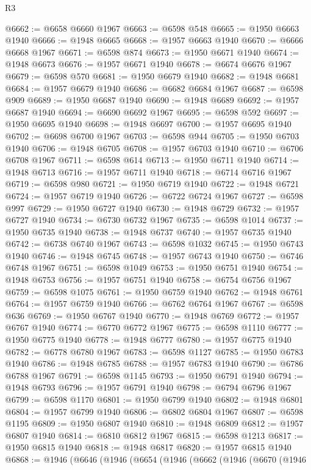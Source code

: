 \begin{lexlean}{R3}
\begin{coremodule}
@6662 := @6658 @6660 @1967
@6663 := @6598 @548
@6665 := @1950 @6663 @1940
@6666 := @1948 @6665
@6668 := @1957 @6663 @1940
@6670 := @6666 @6668 @1967
@6671 := @6598 @874
@6673 := @1950 @6671 @1940
@6674 := @1948 @6673
@6676 := @1957 @6671 @1940
@6678 := @6674 @6676 @1967
@6679 := @6598 @570
@6681 := @1950 @6679 @1940
@6682 := @1948 @6681
@6684 := @1957 @6679 @1940
@6686 := @6682 @6684 @1967
@6687 := @6598 @909
@6689 := @1950 @6687 @1940
@6690 := @1948 @6689
@6692 := @1957 @6687 @1940
@6694 := @6690 @6692 @1967
@6695 := @6598 @592
@6697 := @1950 @6695 @1940
@6698 := @1948 @6697
@6700 := @1957 @6695 @1940
@6702 := @6698 @6700 @1967
@6703 := @6598 @944
@6705 := @1950 @6703 @1940
@6706 := @1948 @6705
@6708 := @1957 @6703 @1940
@6710 := @6706 @6708 @1967
@6711 := @6598 @614
@6713 := @1950 @6711 @1940
@6714 := @1948 @6713
@6716 := @1957 @6711 @1940
@6718 := @6714 @6716 @1967
@6719 := @6598 @980
@6721 := @1950 @6719 @1940
@6722 := @1948 @6721
@6724 := @1957 @6719 @1940
@6726 := @6722 @6724 @1967
@6727 := @6598 @997
@6729 := @1950 @6727 @1940
@6730 := @1948 @6729
@6732 := @1957 @6727 @1940
@6734 := @6730 @6732 @1967
@6735 := @6598 @1014
@6737 := @1950 @6735 @1940
@6738 := @1948 @6737
@6740 := @1957 @6735 @1940
@6742 := @6738 @6740 @1967
@6743 := @6598 @1032
@6745 := @1950 @6743 @1940
@6746 := @1948 @6745
@6748 := @1957 @6743 @1940
@6750 := @6746 @6748 @1967
@6751 := @6598 @1049
@6753 := @1950 @6751 @1940
@6754 := @1948 @6753
@6756 := @1957 @6751 @1940
@6758 := @6754 @6756 @1967
@6759 := @6598 @1075
@6761 := @1950 @6759 @1940
@6762 := @1948 @6761
@6764 := @1957 @6759 @1940
@6766 := @6762 @6764 @1967
@6767 := @6598 @636
@6769 := @1950 @6767 @1940
@6770 := @1948 @6769
@6772 := @1957 @6767 @1940
@6774 := @6770 @6772 @1967
@6775 := @6598 @1110
@6777 := @1950 @6775 @1940
@6778 := @1948 @6777
@6780 := @1957 @6775 @1940
@6782 := @6778 @6780 @1967
@6783 := @6598 @1127
@6785 := @1950 @6783 @1940
@6786 := @1948 @6785
@6788 := @1957 @6783 @1940
@6790 := @6786 @6788 @1967
@6791 := @6598 @1145
@6793 := @1950 @6791 @1940
@6794 := @1948 @6793
@6796 := @1957 @6791 @1940
@6798 := @6794 @6796 @1967
@6799 := @6598 @1170
@6801 := @1950 @6799 @1940
@6802 := @1948 @6801
@6804 := @1957 @6799 @1940
@6806 := @6802 @6804 @1967
@6807 := @6598 @1195
@6809 := @1950 @6807 @1940
@6810 := @1948 @6809
@6812 := @1957 @6807 @1940
@6814 := @6810 @6812 @1967
@6815 := @6598 @1213
@6817 := @1950 @6815 @1940
@6818 := @1948 @6817
@6820 := @1957 @6815 @1940
@6868 := @1946
    (@6646
      (@1946
        (@6654
          (@1946
            (@6662
              (@1946
                (@6670
                  (@1946

\end{coremodule}
\end{lexlean}
